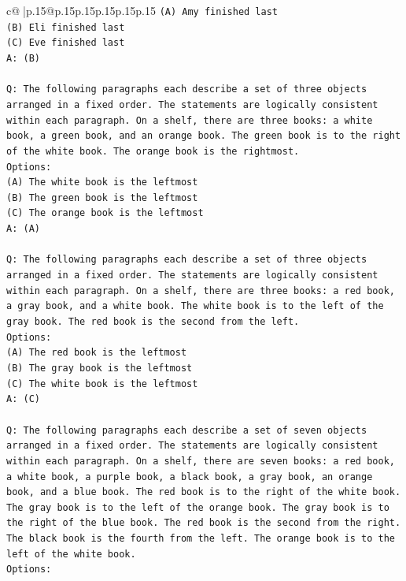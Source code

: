 \documentclass{article}
\begin{document}
{\begin{supertabular}{c@{$\;$}|p{.15\linewidth}@{}p{.15\linewidth}p{.15\linewidth}p{.15\linewidth}p{.15\linewidth}p{.15\linewidth}}
{{{\texttt{(A) Amy finished last} \\
\texttt{(B) Eli finished last} \\
\texttt{(C) Eve finished last} \\
\texttt{A: (B)} \\
\\ 
\texttt{Q: The following paragraphs each describe a set of three objects arranged in a fixed order. The statements are logically consistent within each paragraph. On a shelf, there are three books: a white book, a green book, and an orange book. The green book is to the right of the white book. The orange book is the rightmost.} \\
\texttt{Options:} \\
\texttt{(A) The white book is the leftmost} \\
\texttt{(B) The green book is the leftmost} \\
\texttt{(C) The orange book is the leftmost} \\
\texttt{A: (A)} \\
\\ 
\texttt{Q: The following paragraphs each describe a set of three objects arranged in a fixed order. The statements are logically consistent within each paragraph. On a shelf, there are three books: a red book, a gray book, and a white book. The white book is to the left of the gray book. The red book is the second from the left.} \\
\texttt{Options:} \\
\texttt{(A) The red book is the leftmost} \\
\texttt{(B) The gray book is the leftmost} \\
\texttt{(C) The white book is the leftmost} \\
\texttt{A: (C)} \\
\\ 
\texttt{Q: The following paragraphs each describe a set of seven objects arranged in a fixed order. The statements are logically consistent within each paragraph. On a shelf, there are seven books: a red book, a white book, a purple book, a black book, a gray book, an orange book, and a blue book. The red book is to the right of the white book. The gray book is to the left of the orange book. The gray book is to the right of the blue book. The red book is the second from the right. The black book is the fourth from the left. The orange book is to the left of the white book.} \\
\texttt{Options:} \\
}}}
\end{supertabular}}
\end{document}
